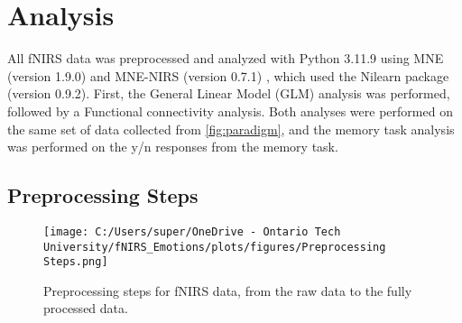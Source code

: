 \section{Analysis}
All fNIRS data was preprocessed and analyzed with Python 3.11.9 using MNE (version 1.9.0) \citep{gramfort_meg_2013} and MNE-NIRS (version 0.7.1) \citep{luke_analysis_2021}, which used the Nilearn package (version 0.9.2). 
First, the General Linear Model (GLM) analysis was performed, followed by a Functional connectivity analysis. 
Both analyses were performed on the same set of data collected from \ref{fig:paradigm}, and the memory task analysis was performed on the y/n responses from the memory task.

\subsection{Preprocessing Steps}
\begin{figure}[H]
    \centering
    \texttt{[image: C:/Users/super/OneDrive - Ontario Tech University/fNIRS\_Emotions/plots/figures/Preprocessing Steps.png]}
    \caption{Preprocessing steps for fNIRS data, from the raw data to the fully processed data. }
    \label{fig:preprocessing_steps}
\end{figure}

